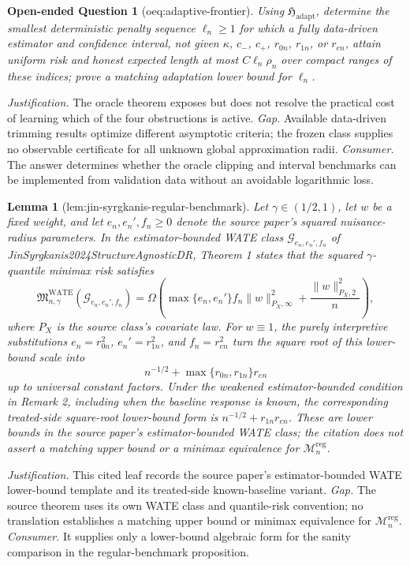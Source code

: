 \documentclass{article}
\newtheorem{lemma}{Lemma}
\newtheorem{openendedquestion}{Open-ended Question}
\begin{document}
\begin{openendedquestion}[oeq:adaptive-frontier]\label{oeq:adaptive-frontier}
Using \(\mathfrak H_{\mathrm{adapt}}\), determine the smallest deterministic penalty sequence \(\ell_n\ge1\) for which a fully data-driven estimator and confidence interval, not given \(\kappa\), \(c_-\), \(c_+\), \(r_{0n}\), \(r_{1n}\), or \(r_{en}\), attain uniform risk and honest expected length at most \(C\ell_n\rho_n\) over compact ranges of these indices; prove a matching adaptation lower bound for \(\ell_n\).
\end{openendedquestion}
\par\smallskip\noindent \textit{Justification.} The oracle theorem exposes but does not resolve the practical cost of learning which of the four obstructions is active. \textit{Gap.} Available data-driven trimming results optimize different asymptotic criteria; the frozen class supplies no observable certificate for all unknown global approximation radii. \textit{Consumer.} The answer determines whether the oracle clipping and interval benchmarks can be implemented from validation data without an avoidable logarithmic loss.

\begin{lemma}[lem:jin-syrgkanis-regular-benchmark]\label{lem:jin-syrgkanis-regular-benchmark}
Let \(\gamma\in(1/2,1)\), let \(w\) be a fixed weight, and let \(e_n,e_n',f_n\ge0\) denote the source paper's squared nuisance-radius parameters.  In the estimator-bounded WATE class \(\mathcal G_{e_n,e_n',f_n}\) of JinSyrgkanis2024StructureAgnosticDR, Theorem 1 states that the squared \(\gamma\)-quantile minimax risk satisfies
\[
\mathfrak M_{n,\gamma}^{\mathrm{WATE}}(\mathcal G_{e_n,e_n',f_n})
=\Omega\!\left(
\max\{e_n,e_n'\}f_n\lVert w\rVert_{P_X,\infty}^{2}
+\frac{\lVert w\rVert_{P_X,2}^{2}}{n}
\right),
\]
where \(P_X\) is the source class's covariate law.  For \(w\equiv1\), the purely interpretive substitutions \(e_n=r_{0n}^{2}\), \(e_n'=r_{1n}^{2}\), and \(f_n=r_{en}^{2}\) turn the square root of this lower-bound scale into
\[
n^{-1/2}+\max\{r_{0n},r_{1n}\}r_{en}
\]
up to universal constant factors.  Under the weakened estimator-bounded condition in Remark 2, including when the baseline response is known, the corresponding treated-side square-root lower-bound form is \(n^{-1/2}+r_{1n}r_{en}\).  These are lower bounds in the source paper's estimator-bounded WATE class; the citation does not assert a matching upper bound or a minimax equivalence for \(\mathcal M_n^{\mathrm{reg}}\).
\end{lemma}
\par\smallskip\noindent \textit{Justification.} This cited leaf records the source paper's estimator-bounded WATE lower-bound template and its treated-side known-baseline variant. \textit{Gap.} The source theorem uses its own WATE class and quantile-risk convention; no translation establishes a matching upper bound or minimax equivalence for \(\mathcal M_n^{\mathrm{reg}}\). \textit{Consumer.} It supplies only a lower-bound algebraic form for the sanity comparison in the regular-benchmark proposition.
\end{document}
